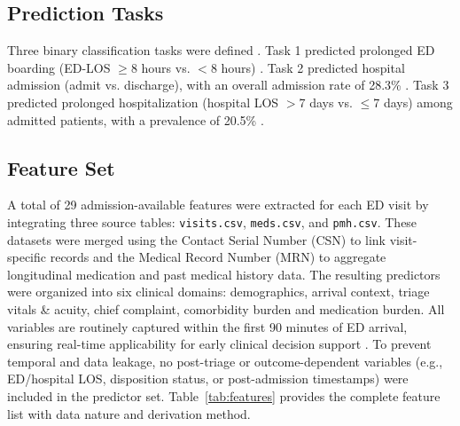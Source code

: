\documentclass[harvard,article]{frontiersinFPHY_FAMS}
\begin{document}
\subsection{Prediction Tasks}

Three binary classification tasks were defined \cite{stone2022, farimani2024}. Task 1 predicted prolonged ED boarding (ED-LOS $\geq$8 hours vs. $<$8 hours) \cite{sun2013, farimani2024}. Task 2 predicted hospital admission (admit vs. discharge), with an overall admission rate of 28.3\% \cite{kansal2025, fenn2021}. Task 3 predicted prolonged hospitalization (hospital LOS $>$7 days vs. $\leq$7 days) among admitted patients, with a prevalence of 20.5\% \cite{stone2022, gokhale2023}.

\subsection{Feature Set}
A total of 29 admission-available features were extracted for each ED visit by integrating three source tables: \texttt{visits.csv}, \texttt{meds.csv}, and \texttt{pmh.csv}. These datasets were merged using the Contact Serial Number (CSN) to link visit-specific records and the Medical Record Number (MRN) to aggregate longitudinal medication and past medical history data. The resulting predictors were organized into six clinical domains: demographics, arrival context, triage vitals \& acuity, chief complaint, comorbidity burden and medication burden. All variables are routinely captured within the first 90 minutes of ED arrival, ensuring real-time applicability for early clinical decision support \cite{levin2020}. To prevent temporal and data leakage, no post-triage or outcome-dependent variables (e.g., ED/hospital LOS, disposition status, or post-admission timestamps) were included in the predictor set. Table~\ref{tab:features} provides the complete feature list with data nature and derivation method.
\end{document}
